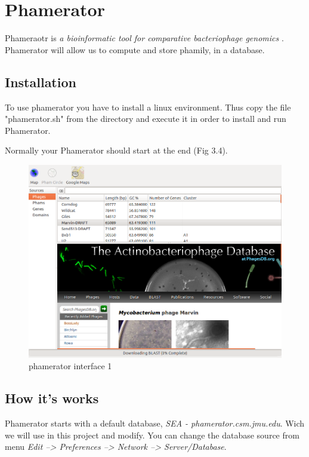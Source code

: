 \documentclass[a4paper,11pt]{report}
\begin{document}
\section{Phamerator}
Phameraotr is \textit{a bioinformatic tool for comparative bacteriophage genomics} \cite{ref4}. Phamerator will allow us to compute and store phamily, in a database. 

\subsection{Installation}
To use phamerator you have to install a linux environment. Thus copy the file "phamerator.sh" from the directory and execute it in order to install and run Phamerator.

Normally your Phamerator should start at the end (Fig 3.4).

\begin{figure}[H] 
	\begin{center}
		\includegraphics[scale=0.3]{img/phamerator_1}
		\caption{phamerator interface 1}
	\end{center}
\end{figure}

\subsection{How it's works}

Phamerator starts with a default database, \textit{SEA - phamerator.csm.jmu.edu}. Wich we will use in this project and modify. You can change the database source from menu \textit{Edit --> Preferences --> Network --> Server/Database}.
\end{document}
